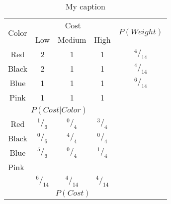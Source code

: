 \documentclass[letterpaper,12pt]{article}
\newcommand*\rfrac[2]{{}^{#1}\!/_{#2}}
\begin{document}
\begin{table}[]
\centering
\caption{My caption}
\label{my-label}
\begin{tabular}{cccccll}
\hline
\multicolumn{1}{|c|}{\multirow{2}{*}{Color}} & \multicolumn{3}{c|}{Cost} & \multicolumn{3}{c|}{\multirow{2}{*}{$P\left(Weight\right)$}} \\
\multicolumn{1}{|c|}{} & Low & Medium & \multicolumn{1}{c|}{High} & \multicolumn{3}{c|}{} \\ \hline
\multicolumn{1}{|c|}{Red} & \multicolumn{1}{c|}{2} & \multicolumn{1}{c|}{1} & \multicolumn{1}{c|}{1} & \multicolumn{3}{c|}{$\rfrac{4}{14}$} \\
\multicolumn{1}{|c|}{Black} & \multicolumn{1}{c|}{2} & \multicolumn{1}{c|}{1} & \multicolumn{1}{c|}{1} & \multicolumn{3}{c|}{$\rfrac{4}{14}$} \\
\multicolumn{1}{|c|}{Blue} & \multicolumn{1}{c|}{1} & \multicolumn{1}{c|}{1} & \multicolumn{1}{c|}{1} & \multicolumn{3}{c|}{$\rfrac{6}{14}$} \\
\multicolumn{1}{|c|}{Pink} & \multicolumn{1}{c|}{1} & \multicolumn{1}{c|}{1} & \multicolumn{1}{c|}{1} & \multicolumn{3}{c|}{} \\ \hline
\multicolumn{4}{|c|}{$P\left(Cost|Color\right)$} &  & \multicolumn{1}{c}{} & \multicolumn{1}{c}{} \\ \cline{1-4}
\multicolumn{1}{|c|}{Red} & \multicolumn{1}{c|}{$\rfrac{1}{6}$} & \multicolumn{1}{c|}{$\rfrac{0}{4}$} & \multicolumn{1}{c|}{$\rfrac{3}{4}$} &  & \multicolumn{1}{c}{} & \multicolumn{1}{c}{} \\
\multicolumn{1}{|c|}{Black} & \multicolumn{1}{c|}{$\rfrac{0}{6}$} & \multicolumn{1}{c|}{$\rfrac{4}{4}$} & \multicolumn{1}{c|}{$\rfrac{0}{4}$} & \multicolumn{1}{l}{} &  &  \\
\multicolumn{1}{|c|}{Blue} & \multicolumn{1}{c|}{$\rfrac{5}{6}$} & \multicolumn{1}{c|}{$\rfrac{0}{4}$} & \multicolumn{1}{c|}{$\rfrac{1}{4}$} & \multicolumn{1}{l}{} &  &  \\ \cline{1-4}
\multicolumn{1}{l}{Pink} & \multicolumn{1}{l}{} & \multicolumn{1}{l}{} & \multicolumn{1}{l}{} & \multicolumn{1}{l}{} &  &  \\
\multicolumn{1}{c|}{} & \multicolumn{1}{c|}{$\rfrac{6}{14}$} & \multicolumn{1}{c|}{$\rfrac{4}{14}$} & \multicolumn{1}{c|}{$\rfrac{4}{14}$} & \multicolumn{1}{l}{} &  &  \\ \cline{2-4}
\multicolumn{1}{l|}{} & \multicolumn{3}{c|}{$P\left(Cost\right)$} & \multicolumn{1}{l}{} &  &  \\ \cline{2-4}
\end{tabular}
\end{table}
\end{document}

